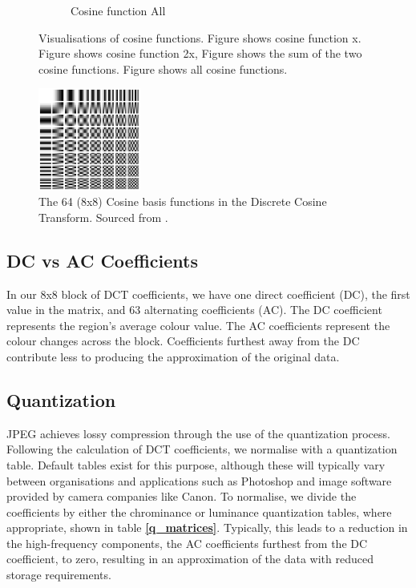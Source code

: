 \documentclass{l4proj}
\begin{document}
\begin{figure}[]
\begin{subfigure}[b]{0.35\textwidth}
        \caption{Cosine function All}
        \label{fig:cos_all}
    \end{subfigure}
    \caption{Visualisations of cosine functions. Figure  shows cosine function x. Figure  shows cosine function 2x, Figure  shows the sum of the two cosine functions. Figure  shows all cosine functions. }
\end{figure}

\begin{figure}[]
    \centering
    \includegraphics[width=0.3\textwidth]{images/dct_basis_functions.png}
    \caption{The 64 (8x8) Cosine basis functions in the Discrete Cosine Transform. Sourced from \citet{khalid_2021}.}
    \label{fig:dct_basis_functions}
\end{figure}

\subsection{DC vs AC Coefficients}

In our 8x8 block of DCT coefficients, we have one direct coefficient (DC), the first value in the matrix, and 63 alternating coefficients (AC). The DC coefficient represents the region's average colour value. The AC coefficients represent the colour changes across the block. Coefficients furthest away from the DC contribute less to producing the approximation of the original data. 

\subsection{Quantization}

JPEG achieves lossy compression through the use of the quantization process. Following the calculation of DCT coefficients, we normalise with a quantization table. Default tables exist for this purpose, although these will typically vary between organisations and applications such as Photoshop and image software provided by camera companies like Canon. To normalise, we divide the coefficients by either the chrominance or luminance quantization tables, where appropriate, shown in table \textbf{\ref{q_matrices}}. Typically, this leads to a reduction in the high-frequency components, the AC coefficients furthest from the DC coefficient, to zero, resulting in an approximation of the data with reduced storage requirements.
\end{document}
